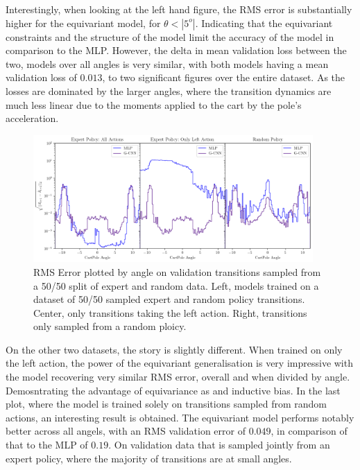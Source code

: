 Interestingly, when looking at the left hand figure, the RMS error is substantially higher for the equivariant model, for $\theta <|5^o|$. Indicating that the equivariant constraints and the structure of the model limit the accuracy of the model in comparison to the MLP. However, the delta in mean validation loss between the two, models over all angles is very similar, with both models having a mean validation loss of $0.013$, to two significant figures over the entire dataset. As the losses are dominated by the larger angles, where the transition dynamics are much less linear due to the moments applied to the cart by the pole's acceleration.
\begin{figure}[h!]
  \label{fig:cp_model_angle}
  \begin{center}
    \includegraphics[width=0.95\textwidth]{./Figures/transition_model_cp_angle.png}
  \end{center}
  \caption{RMS Error plotted by angle on validation transitions sampled from a 50/50 split of expert and random data. Left, models trained on a dataset of 50/50 sampled expert and random policy transitions. Center, only transitions taking the left action. Right, transitions only sampled from a random ploicy.}
  \label{fig:}
\end{figure}

On the other two datasets, the story is slightly different. When trained on only the left action, the power of the equivariant generalisation is very impressive with the model recovering very similar RMS error, overall and when divided by angle. Demosntrating the advantage of equivariance as and inductive bias.
In the last plot, where the model is trained solely on transitions sampled from random actions, an interesting result is obtained. The equivariant model performs notably better across all angels, with an RMS validation error of $0.049$, in comparison of that to the MLP of $0.19$. On validation data that is sampled jointly from an expert policy, where the majority of transitions are at small angles. 








